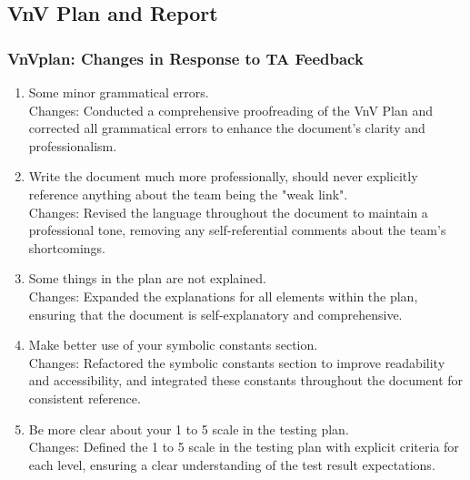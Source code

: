 \documentclass{article}
\begin{document}
\subsection{VnV Plan and Report}
\subsubsection{VnVplan: Changes in Response to TA Feedback}
\begin{enumerate}
        \item Some minor grammatical errors. \\
        Changes: Conducted a comprehensive proofreading of the VnV Plan and corrected all grammatical errors to enhance the document's clarity and professionalism.
        \item Write the document much more professionally, should never explicitly 
        reference anything about the team being the "weak link".\\
        Changes: Revised the language throughout the document to maintain a professional tone, removing any self-referential comments about the team's shortcomings.
        \item Some things in the plan are not explained.\\
        Changes: Expanded the explanations for all elements within the plan, ensuring that the document is self-explanatory and comprehensive.
        \item Make better use of your symbolic constants section.\\
        Changes: Refactored the symbolic constants section to improve readability and accessibility, and integrated these constants throughout the document for consistent reference.
        \item Be more clear about your 1 to 5 scale in the testing plan.\\
        Changes: Defined the 1 to 5 scale in the testing plan with explicit criteria for each level, ensuring a clear understanding of the test result expectations.
\end{enumerate}   
\end{document}
